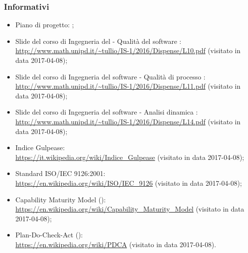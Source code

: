 \documentclass[PdQ.tex]{subfiles}
\begin{document}
		\subsubsection{Informativi}
			\begin{itemize}
				\item Piano di progetto: \PPdoc{};
				\item Slide del corso di Ingegneria del  - Qualità del software : \\
				\url{http://www.math.unipd.it/~tullio/IS-1/2016/Dispense/L10.pdf} (visitato in data 2017-04-08);
				\item Slide del corso di Ingegneria del software - Qualità di processo : \\
				\url{http://www.math.unipd.it/~tullio/IS-1/2016/Dispense/L11.pdf} (visitato in data 2017-04-08);
				\item Slide del corso di Ingegneria del software - Analisi dinamica : \\
				\url{http://www.math.unipd.it/~tullio/IS-1/2016/Dispense/L14.pdf} (visitato in data 2017-04-08);
				\item Indice Gulpease: \\
				\url{https://it.wikipedia.org/wiki/Indice_Gulpease} (visitato in data 2017-04-08);
				\item Standard ISO/IEC 9126:2001: \\
				\url{https://en.wikipedia.org/wiki/ISO/IEC_9126} (visitato in data 2017-04-08);
				\item Capability Maturity Model (): \\
				\url{https://en.wikipedia.org/wiki/Capability_Maturity_Model} (visitato in data 2017-04-08);
				\item Plan-Do-Check-Act (): \\
				\url{https://en.wikipedia.org/wiki/PDCA} (visitato in data 2017-04-08).
			\end{itemize}
			
\end{document}
